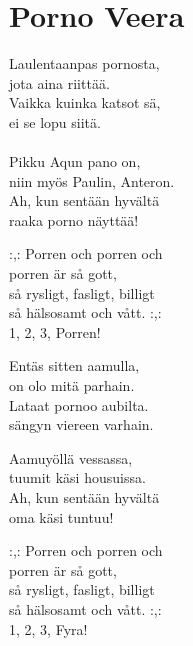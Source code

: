 \section{Porno Veera}
Laulentaanpas pornosta,\\
jota aina riittää.\\
Vaikka kuinka katsot sä,\\
ei se lopu siitä.\\
\\
Pikku Aqun pano on,\\
niin myös Paulin, Anteron.\\
Ah, kun sentään hyvältä\\
raaka porno näyttää!

:,: Porren och porren och\\
porren är så gott,\\
så rysligt, fasligt, billigt\\
så hälsosamt och vått. :,:\\
1, 2, 3, Porren!

Entäs sitten aamulla,\\
on olo mitä parhain.\\
Lataat pornoo aubilta.\\
sängyn viereen varhain.

Aamuyöllä vessassa,\\
tuumit käsi housuissa.\\
Ah, kun sentään hyvältä\\
oma käsi tuntuu!

:,: Porren och porren och\\
porren är så gott,\\
så rysligt, fasligt, billigt\\
så hälsosamt och vått. :,:\\
1, 2, 3, Fyra!